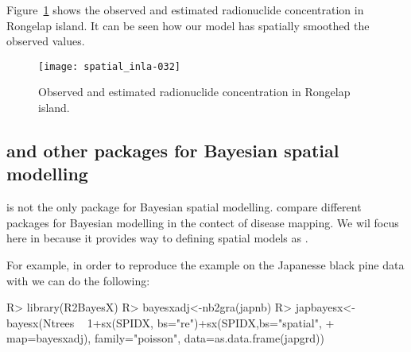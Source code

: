 \documentclass[article]{jss}
\begin{document}


\begin{Schunk}
\end{Schunk}



Figure~\ref{fig:geos} shows the observed and estimated radionuclide
concentration in Rongelap island. It can be seen how our model has spatially
smoothed the observed values.

\begin{figure}[h]
\begin{center}
\texttt{[image: spatial\_inla-032]}
\caption{Observed  and estimated radionuclide concentration
in Rongelap island.}
\label{fig:geos}
\end{center}
\end{figure}

\subsection[{R-INLA} and other packages for Bayesian spatial modelling]{ and other packages for Bayesian spatial modelling}

 is not the only package for Bayesian spatial modelling.
\citet[Chapter 10]{Bivandetal:2013} compare different packages for Bayesian
modelling in the contect of disease mapping. We wil focus here in 
because it provides way to defining spatial models as
.


For example, in order to reproduce the example on the Japanesse black pine
data with  we can do the following:

\begin{Schunk}
\begin{Sinput}
R> library(R2BayesX)
R> bayesxadj<-nb2gra(japnb)
R> japbayesx<-bayesx(Ntrees ~ 1+sx(SPIDX, bs="re")+sx(SPIDX,bs="spatial", 
+     map=bayesxadj), family="poisson", data=as.data.frame(japgrd))
\end{Sinput}
\end{Schunk}
\end{document}

